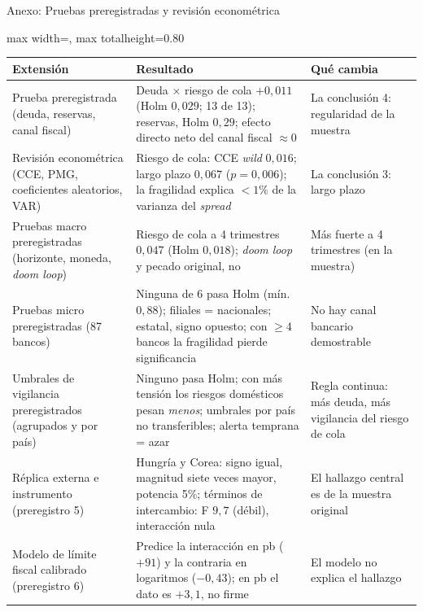 \documentclass[aspectratio=169]{beamer}
\begin{document}
\begin{frame}{Anexo: Pruebas preregistradas y revisión econométrica}
\centering
\footnotesize
\begin{adjustbox}{max width=\textwidth, max totalheight=0.80\textheight}
\begin{tabular}{>{\raggedright\arraybackslash}p{}>{\raggedright\arraybackslash}p{}>{\raggedright\arraybackslash}p{}}
\toprule
Extensión & Resultado & Qué cambia \\
\midrule
Prueba preregistrada (deuda, reservas, canal fiscal) & Deuda $\times$ riesgo de cola $+0{,}011$ (Holm $0{,}029$; 13 de 13); reservas, Holm $0{,}29$; efecto directo neto del canal fiscal $\approx0$ & La conclusión 4: regularidad de la muestra \\
\addlinespace
Revisión econométrica (CCE, PMG, coeficientes aleatorios, VAR) & Riesgo de cola: CCE \textit{wild} $0{,}016$; largo plazo $0{,}067$ ($p=0{,}006$); la fragilidad explica $<1\%$ de la varianza del \textit{spread} & La conclusión 3: largo plazo \\
\addlinespace
Pruebas macro preregistradas (horizonte, moneda, \textit{doom loop}) & Riesgo de cola a 4 trimestres $0{,}047$ (Holm $0{,}018$); \textit{doom loop} y pecado original, no & Más fuerte a 4 trimestres (en la muestra) \\
\addlinespace
Pruebas micro preregistradas (87 bancos) & Ninguna de 6 pasa Holm (mín.\ $0{,}88$); filiales = nacionales; estatal, signo opuesto; con $\geq4$ bancos la fragilidad pierde significancia & No hay canal bancario demostrable \\
\addlinespace
Umbrales de vigilancia preregistrados (agrupados y por país) & Ninguno pasa Holm; con más tensión los riesgos domésticos pesan \emph{menos}; umbrales por país no transferibles; alerta temprana = azar & Regla continua: más deuda, más vigilancia del riesgo de cola \\
\addlinespace
Réplica externa e instrumento (preregistro 5) & Hungría y Corea: signo igual, magnitud siete veces mayor, potencia 5\%; términos de intercambio: F $9{,}7$ (débil), interacción nula & El hallazgo central es de la muestra original \\
\addlinespace
Modelo de límite fiscal calibrado (preregistro 6) & Predice la interacción en pb ($+91$) y la contraria en logaritmos ($-0{,}43$); en pb el dato es $+3{,}1$, no firme & El modelo no explica el hallazgo \\
\bottomrule
\end{tabular}
\end{adjustbox}
\end{frame}
\end{document}
